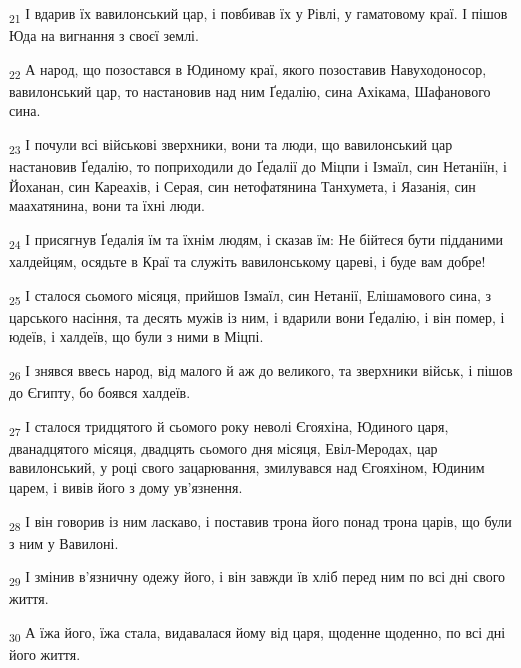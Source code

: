 \begin{tcolorbox}
\textsubscript{21} І вдарив їх вавилонський цар, і повбивав їх у Рівлі, у гаматовому краї. І пішов Юда на вигнання з своєї землі.
\end{tcolorbox}
\begin{tcolorbox}
\textsubscript{22} А народ, що позостався в Юдиному краї, якого позоставив Навуходоносор, вавилонський цар, то настановив над ним Ґедалію, сина Ахікама, Шафанового сина.
\end{tcolorbox}
\begin{tcolorbox}
\textsubscript{23} І почули всі військові зверхники, вони та люди, що вавилонський цар настановив Ґедалію, то поприходили до Ґедалії до Міцпи і Ізмаїл, син Нетаніїн, і Йоханан, син Кареахів, і Серая, син нетофатянина Танхумета, і Яазанія, син маахатянина, вони та їхні люди.
\end{tcolorbox}
\begin{tcolorbox}
\textsubscript{24} І присягнув Ґедалія їм та їхнім людям, і сказав їм: Не бійтеся бути підданими халдейцям, осядьте в Краї та служіть вавилонському цареві, і буде вам добре!
\end{tcolorbox}
\begin{tcolorbox}
\textsubscript{25} І сталося сьомого місяця, прийшов Ізмаїл, син Нетанії, Елішамового сина, з царського насіння, та десять мужів із ним, і вдарили вони Ґедалію, і він помер, і юдеїв, і халдеїв, що були з ними в Міцпі.
\end{tcolorbox}
\begin{tcolorbox}
\textsubscript{26} І знявся ввесь народ, від малого й аж до великого, та зверхники військ, і пішов до Єгипту, бо боявся халдеїв.
\end{tcolorbox}
\begin{tcolorbox}
\textsubscript{27} І сталося тридцятого й сьомого року неволі Єгояхіна, Юдиного царя, дванадцятого місяця, двадцять сьомого дня місяця, Евіл-Меродах, цар вавилонський, у році свого зацарювання, змилувався над Єгояхіном, Юдиним царем, і вивів його з дому ув'язнення.
\end{tcolorbox}
\begin{tcolorbox}
\textsubscript{28} І він говорив із ним ласкаво, і поставив трона його понад трона царів, що були з ним у Вавилоні.
\end{tcolorbox}
\begin{tcolorbox}
\textsubscript{29} І змінив в'язничну одежу його, і він завжди їв хліб перед ним по всі дні свого життя.
\end{tcolorbox}
\begin{tcolorbox}
\textsubscript{30} А їжа його, їжа стала, видавалася йому від царя, щоденне щоденно, по всі дні його життя.
\end{tcolorbox}
